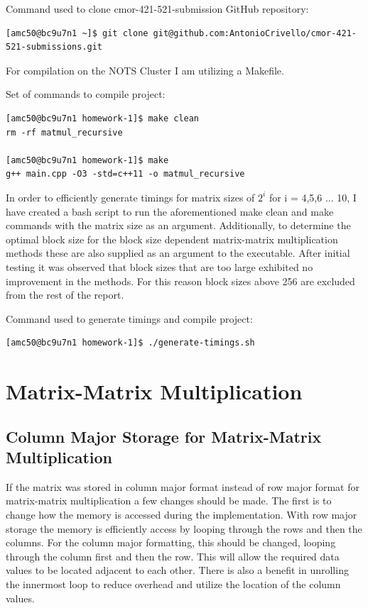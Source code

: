 \documentclass{article}
\begin{document}
\bigskip
\noindent Command used to clone cmor-421-521-submission GitHub repository:
\begin{verbatim}
[amc50@bc9u7n1 ~]$ git clone git@github.com:AntonioCrivello/cmor-421-521-submissions.git    
\end{verbatim}

\bigskip
\noindent For compilation on the NOTS Cluster I am utilizing a Makefile. 

\bigskip
\noindent Set of commands to compile project: 
\begin{verbatim}
[amc50@bc9u7n1 homework-1]$ make clean
rm -rf matmul_recursive 

[amc50@bc9u7n1 homework-1]$ make
g++ main.cpp -O3 -std=c++11 -o matmul_recursive
\end{verbatim}

\bigskip
\noindent In order to efficiently generate timings for matrix sizes of $2^{i}$ for i = 4,5,6 ... 10, I have created a bash script to run the aforementioned make clean and make commands with the matrix size as an argument. Additionally, to determine the optimal block size for the block size dependent matrix-matrix multiplication methods these are also supplied as an argument to the executable. After initial testing it was observed that block sizes that are too large exhibited no improvement in the methods. For this reason block sizes above 256 are excluded from the rest of the report.

\bigskip
\noindent Command used to generate timings and compile project:
\begin{verbatim}
[amc50@bc9u7n1 homework-1]$ ./generate-timings.sh 
\end{verbatim}

\section{Matrix-Matrix Multiplication}

\subsection{Column Major Storage for Matrix-Matrix Multiplication}
If the matrix was stored in column major format instead of row major format for matrix-matrix multiplication a few changes should be made. The first is to change how the memory is accessed during the implementation. With row major storage the memory is efficiently access by looping through the rows and then the columns. For the column major formatting, this should be changed, looping through the column first and then the row. This will allow the required data values to be located adjacent to each other. There is also a benefit in unrolling the innermost loop to reduce overhead and utilize the
location of the column values.
\end{document}
